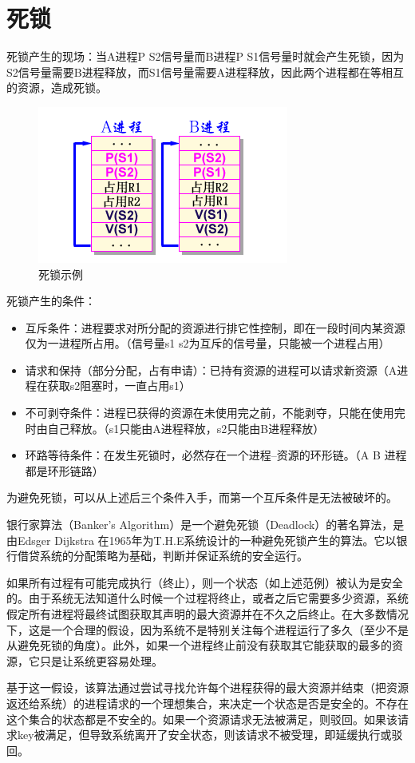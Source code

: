 \section{死锁}


死锁产生的现场：当A进程P S2信号量而B进程P S1信号量时就会产生死锁，因为S2信号量需要B进程释放，而S1信号量需要A进程释放，因此两个进程都在等相互的资源，造成死锁。

\begin{figure}[ht]
	\begin{center}
		\includegraphics[keepaspectratio,width=0.5\paperwidth]{Pictures/deadlock.png}
	\caption{死锁示例}
	\label{fig:deadlock}
	\end{center}
\end{figure}

死锁产生的条件：
\begin{itemize}
\item  
互斥条件：进程要求对所分配的资源进行排它性控制，即在一段时间内某资源仅为一进程所占用。（信号量s1 s2为互斥的信号量，只能被一个进程占用）
\item  
请求和保持（部分分配，占有申请）：已持有资源的进程可以请求新资源（A进程在获取s2阻塞时，一直占用s1）
\item  
不可剥夺条件：进程已获得的资源在未使用完之前，不能剥夺，只能在使用完时由自己释放。（s1只能由A进程释放，s2只能由B进程释放）
\item  
环路等待条件：在发生死锁时，必然存在一个进程--资源的环形链。（A B 进程都是环形链路）
\end{itemize}

为避免死锁，可以从上述后三个条件入手，而第一个互斥条件是无法被破坏的\cite{pibible}。

银行家算法（Banker's Algorithm）是一个避免死锁（Deadlock）的著名算法，是由Edsger Dijkstra 在1965年为T.H.E系统设计的一种避免死锁产生的算法。它以银行借贷系统的分配策略为基础，判断并保证系统的安全运行。

如果所有过程有可能完成执行（终止），则一个状态（如上述范例）被认为是安全的。由于系统无法知道什么时候一个过程将终止，或者之后它需要多少资源，系统假定所有进程将最终试图获取其声明的最大资源并在不久之后终止。在大多数情况下，这是一个合理的假设，因为系统不是特别关注每个进程运行了多久（至少不是从避免死锁的角度）。此外，如果一个进程终止前没有获取其它能获取的最多的资源，它只是让系统更容易处理。


基于这一假设，该算法通过尝试寻找允许每个进程获得的最大资源并结束（把资源返还给系统）的进程请求的一个理想集合，来决定一个状态是否是安全的。不存在这个集合的状态都是不安全的。如果一个资源请求无法被满足，则驳回。如果该请求key被满足，但导致系统离开了安全状态，则该请求不被受理，即延缓执行或驳回。

